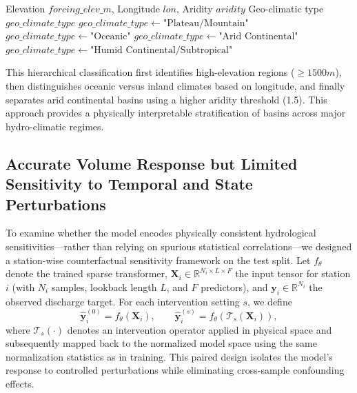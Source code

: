 \documentclass[11pt]{article}
\begin{document}
\begin{algorithm}[htbp]
    \caption{Hierarchical classification for geo-climatic type}
    \label{alg:geo_climate}
    \begin{algorithmic}[1]
        \Require Elevation $forcing\_elev\_m$, Longitude $lon$, Aridity $aridity$
        \Ensure Geo-climatic type $geo\_climate\_type$
        \State $geo\_climate\_type \gets \text{"Plateau/Mountain"}$
        \State $geo\_climate\_type \gets \text{"Oceanic"}$
        \State $geo\_climate\_type \gets \text{"Arid Continental"}$
        \Else
        \State $geo\_climate\_type \gets \text{"Humid Continental/Subtropical"}$
        \EndIf
    \end{algorithmic}
\end{algorithm}

This hierarchical classification first identifies high-elevation regions ($\geq 1500 m$), then distinguishes oceanic versus inland climates based on longitude, and finally separates arid continental basins using a higher aridity threshold (1.5). This approach provides a physically interpretable stratification of basins across major hydro-climatic regimes.

\subsection{Accurate Volume Response but Limited Sensitivity to Temporal and State Perturbations}
\label{sec:sensitive}

To examine whether the model encodes physically consistent hydrological sensitivities—rather than relying on spurious statistical correlations—we designed a station-wise counterfactual sensitivity framework on the test split\cite{simic2025perturbation}. Let $f_{\theta}$ denote the trained sparse transformer, $\mathbf{X}_{i}\in\mathbb{R}^{N_i\times L\times F}$ the input tensor for station $i$ (with $N_i$ samples, lookback length $L$, and $F$ predictors), and $\mathbf{y}_{i}\in\mathbb{R}^{N_i}$ the observed discharge target. For each intervention setting $s$, we define
\begin{equation}
    \hat{\mathbf{y}}_{i}^{(0)} = f_{\theta}(\mathbf{X}_{i}),
    \qquad
    \hat{\mathbf{y}}_{i}^{(s)} = f_{\theta}(\mathcal{T}_{s}(\mathbf{X}_{i})),
\end{equation}
where $\mathcal{T}_{s}(\cdot)$ denotes an intervention operator applied in physical space and subsequently mapped back to the normalized model space using the same normalization statistics as in training\cite{read2019process}. This paired design isolates the model’s response to controlled perturbations while eliminating cross-sample confounding effects\cite{10.2166/wcc.2017.149}.
\end{document}

